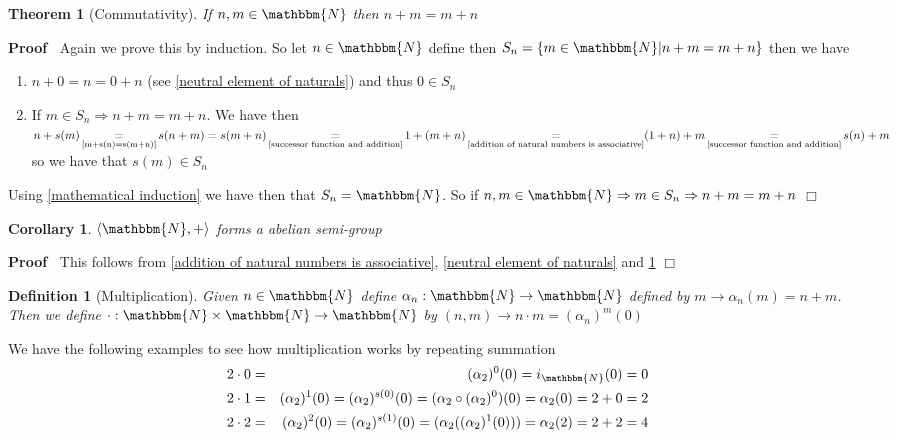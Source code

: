 \documentclass{book}
\newcommand{\equallim}{\mathop{=}\limits}
\newcommand{\nobracket}{}
\newcommand{\upl}{+}
\newenvironment{proof}{\noindent\textbf{Proof\ }}{\hspace*{\fill}$\Box$\medskip}
\newtheorem{corollary}{Corollary}
\newtheorem{definition}{Definition}
{\theorembodyfont{\rmfamily}\newtheorem{example}{Example}}
\newtheorem{theorem}{Theorem}
\begin{document}
{{\begin{theorem}[Commutativity]
  \label{natural numbers are commutative}If $n, m \in \mathbbm{N}$ then $n
  \upl m = m \upl n$
\end{theorem}

\begin{proof}
  Again we prove this by induction. So let $n \in \mathbbm{N}$ define then
  $S_n = \{ m \in \mathbbm{N} | n \upl m = m \upl n \nobracket \}$ then we
  have
  \begin{enumerate}
    \item $n \upl 0 = n = 0 \upl n$ (see \ref{neutral element of naturals})
    and thus $0 \in S_n$
    
    \item If $m \in S_n \Rightarrow n \upl m = m \upl n$. We have then $n \upl
    s (m) \equallim_{\text{\ref{m+s(n)=s(m+n)}}} s (n \upl m) = s (m \upl n)
    \equallim_{\text{\ref{successor function and addition}}} 1 \upl (m \upl n)
    \equallim_{\text{\ref{addition of natural numbers is associative}}} (1
    \upl n) \upl m \equallim_{\text{\ref{successor function and addition}}} s
    (n) \upl m$ so we have that $s (m) \in S_n$
  \end{enumerate}
  Using \ref{mathematical induction} we have then that $S_n =\mathbbm{N}$. So
  if $n, m \in \mathbbm{N} \Rightarrow m \in S_n \Rightarrow n \upl m = m \upl
  n$
\end{proof}

\begin{corollary}
  \label{N,+ is a abelian semi-group}$\langle \mathbbm{N}, + \rangle$ forms a
  abelian semi-group
\end{corollary}

\begin{proof}
  This follows from \ref{addition of natural numbers is associative},
  \ref{neutral element of naturals} and \ref{natural numbers are commutative}
\end{proof}

\begin{definition}[Multiplication]
  \label{multiplaction of natural numbers}{}Given $n \in \mathbbm{N}$ define $\alpha_n : \mathbbm{N}
  \rightarrow \mathbbm{N}$ defined by $m \rightarrow \alpha_n (m) = n \upl m$.
  Then we define $\cdot : \mathbbm{N} \times \mathbbm{N} \rightarrow
  \mathbbm{N}$ by $(n, m) \rightarrow n \cdot m = (\alpha_n)^m (0)$
\end{definition}

\begin{example}
  We have the following examples to see how multiplication works by repeating
  summation
  \begin{eqnarray*}
    2 \cdot 0 & = & (\alpha_2)^0 (0) = i_{\mathbbm{N}} (0) = 0\\
    2 \cdot 1 & = & (\alpha_2)^1 (0) = (\alpha_2)^{s (0)} (0) = (\alpha_2
    \circ (\alpha_2)^0) (0) = \alpha_2 (0) = 2 \upl 0 = 2\\
    2 \cdot 2 & = & (\alpha_2)^2 (0) = (\alpha_2)^{s (1)} (0) = (\alpha_2
    ((\alpha_2)^1 (0))) = \alpha_2 (2) = 2 \upl 2 = 4
  \end{eqnarray*}
\end{example}

}}
\end{document}
